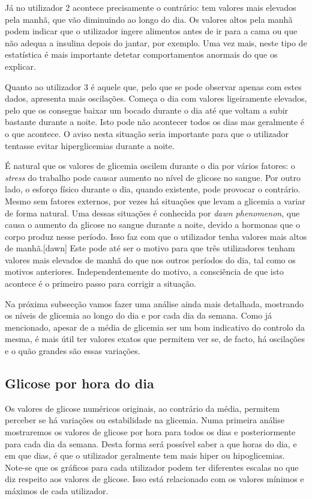 Já no utilizador 2 acontece precisamente o contrário: tem valores mais elevados pela manhã, que vão diminuindo ao longo do dia. Os valores altos pela manhã podem indicar que o utilizador ingere alimentos antes de ir para a cama ou que não adequa a insulina depois do jantar, por exemplo. Uma vez mais, neste tipo de estatística é mais importante detetar comportamentos anormais do que os explicar. 

Quanto ao utilizador 3 é aquele que, pelo que se pode observar apenas com estes dados, apresenta mais oscilações. Começa o dia com valores ligeiramente elevados, pelo que os consegue baixar um bocado durante o dia até que voltam a subir bastante durante a noite. Isto pode não acontecer todos os dias mas geralmente é o que acontece. O aviso nesta situação seria importante para que o utilizador tentasse evitar hiperglicemias durante a noite.

É natural que os valores de glicemia oscilem durante o dia por vários fatores: o \textit{stress} do trabalho pode causar aumento no nível de glicose no sangue. Por outro lado, o esforço físico durante o dia, quando existente, pode provocar o contrário. Mesmo sem fatores externos, por vezes há situações que levam a glicemia a variar de forma natural. Uma dessas situações é conhecida por \textit{dawn phenomenon}, que causa o aumento da glicose no sangue durante a noite, devido a hormonas que o corpo produz nesse período. Isso faz com que o utilizador tenha valores mais altos de manhã.[dawn] Este pode até ser o motivo para que três utilizadores tenham valores mais elevados de manhã do que nos outros períodos do dia, tal como os motivos anteriores. Independentemente do motivo, a consciência de que isto acontece é o primeiro passo para corrigir a situação.\newline



Na próxima subsecção vamos fazer uma análise ainda mais detalhada, mostrando os níveis de glicemia ao longo do dia e por cada dia da semana. Como já mencionado, apesar de a média de glicemia ser um bom indicativo do controlo da mesma, é mais útil ter valores exatos que permitem ver se, de facto, há oscilações e o quão grandes são essas variações.

\subsection{Glicose por hora do dia}

Os valores de glicose numéricos originais, ao contrário da média, permitem perceber se há variações ou estabilidade na glicemia. Numa primeira análise mostraremos os valores de glicose por hora para todos os dias e posteriormente para cada dia da semana. Desta forma será possível saber a que horas do dia, e em que dias, é que o utilizador geralmente tem mais hiper ou hipoglicemias. Note-se que os gráficos para cada utilizador podem ter diferentes escalas no que diz respeito aos valores de glicose. Isso está relacionado com os valores mínimos e máximos de cada utilizador. \newpage

